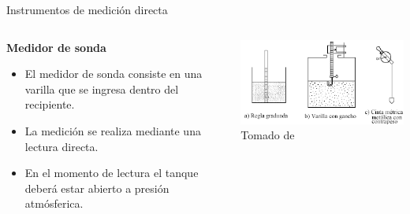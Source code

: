 \documentclass[aspectratio=169]{beamer}
\begin{document}
\begin{frame}{Instrumentos de medición directa}
    \begin{columns}[c, onlytextwidth]
        \begin{column}{0.45\textwidth}
        \textbf{Medidor de sonda}
            \begin{itemize}
                \item El medidor de sonda consiste en una varilla que se ingresa dentro del recipiente. 
                \item La medición se realiza mediante una lectura directa.  
                \item En el momento de lectura el tanque deberá estar abierto a presión atmósferica.
            \end{itemize}
        \end{column}
        \begin{column}{0.50\textwidth}
            \includegraphics[width = 1.1\linewidth]{fig/Nivel/MedicionSonda.png}
            \tiny{Tomado de \cite{sole2005instrumentacion}}
        \end{column}
    \end{columns}
\end{frame}
\end{document}
